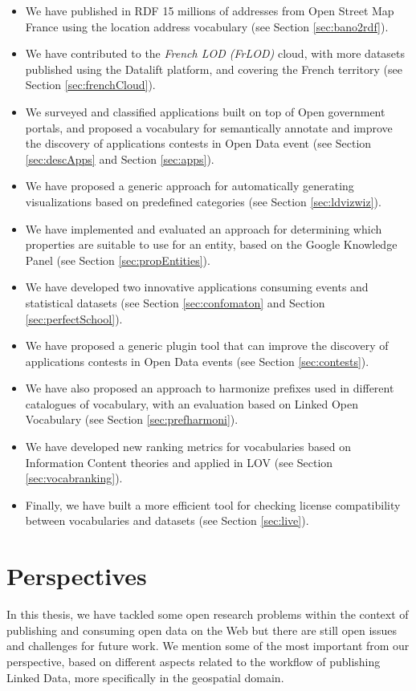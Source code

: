 \documentclass[a4paper,11pt,twoside]{report}
\begin{document}
\begin{itemize}
\item We have published in RDF 15 millions of addresses from Open Street Map France using the location address vocabulary (see Section \ref{sec:bano2rdf}).
\item We have contributed to the \textit{French LOD (FrLOD)} cloud, with more datasets published using the Datalift platform, and covering the French territory (see Section \ref{sec:frenchCloud}).
\item We surveyed and classified applications built on top of Open government portals, and proposed a vocabulary for semantically annotate and improve the discovery of applications contests in Open Data event (see Section \ref{sec:descApps} and Section \ref{sec:apps}).
\item We have proposed a generic approach for automatically generating visualizations based on predefined categories (see Section \ref{sec:ldvizwiz}).
\item We have implemented and evaluated an approach for determining which properties are suitable to use for an entity, based on the Google Knowledge Panel (see Section \ref{sec:propEntities}).
\item We have developed two innovative applications consuming events and statistical datasets (see Section \ref{sec:confomaton} and Section \ref{sec:perfectSchool}).
\item We have proposed a generic plugin tool that can improve the discovery of applications contests in Open Data events (see Section \ref{sec:contests}).
\item We have also proposed an approach to harmonize prefixes used in different catalogues of vocabulary, with an evaluation based on Linked Open Vocabulary (see Section \ref{sec:prefharmoni}).
\item We have developed new ranking metrics for vocabularies based on Information Content theories and applied in LOV (see Section \ref{sec:vocabranking}).

\item Finally, we have built a more efficient tool for checking license compatibility between vocabularies and datasets (see Section \ref{sec:live}).
\end{itemize}


\section*{Perspectives}
\label{sec:future}

In this thesis, we have tackled some open research problems within the context of publishing and consuming open data on the Web but there are still open issues and challenges for future work. We  mention some of the most important from our perspective, based on different aspects related to the workflow of publishing Linked Data, more specifically in the geospatial domain. 
\end{document}
